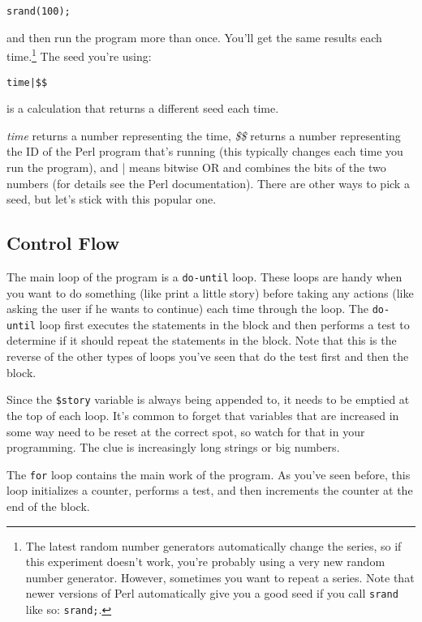 \begin{lstlisting}
srand(100);
\end{lstlisting}

and then run the program more than once. You'll get the same results each time.\footnote{The latest random number generators automatically change the series, so if this experiment doesn't work, you're probably using a very new random number generator. However, sometimes you want to repeat a series. Note that newer versions of Perl automatically give you a good seed if you call \verb|srand| like so: \verb|srand;|.} The seed you're using: 
    
\begin{lstlisting}
time|$$ 
\end{lstlisting}
    
is a calculation that returns a different seed each time.
    
\textit{time} returns a number representing the time, \textit{\$\$} returns a number representing the ID of the Perl program that's running (this typically changes each time you run the program), and | means bitwise OR and combines the bits of the two numbers (for details see the Perl documentation). There are other ways to pick a seed, but let's stick with this popular one.

\subsection{Control Flow}
The main loop of the program is a \verb|do-until| loop. These loops are handy when you want to do something (like print a little story) before taking any actions (like asking the user if he wants to continue) each time through the loop. The \verb|do-until| loop first executes the statements in the block and then performs a test to determine if it should repeat the statements in the block. Note that this is the reverse of the other types of loops you've seen that do the test first and then the block.

Since the \verb|$story| variable is always being appended to, it needs to be emptied at the top of each loop. It's common to forget that variables that are increased in some way need to be reset at the correct spot, so watch for that in your programming. The clue is increasingly long strings or big numbers.

The \verb|for| loop contains the main work of the program. As you've seen before, this loop initializes a counter, performs a test, and then increments the counter at the end of the block.

